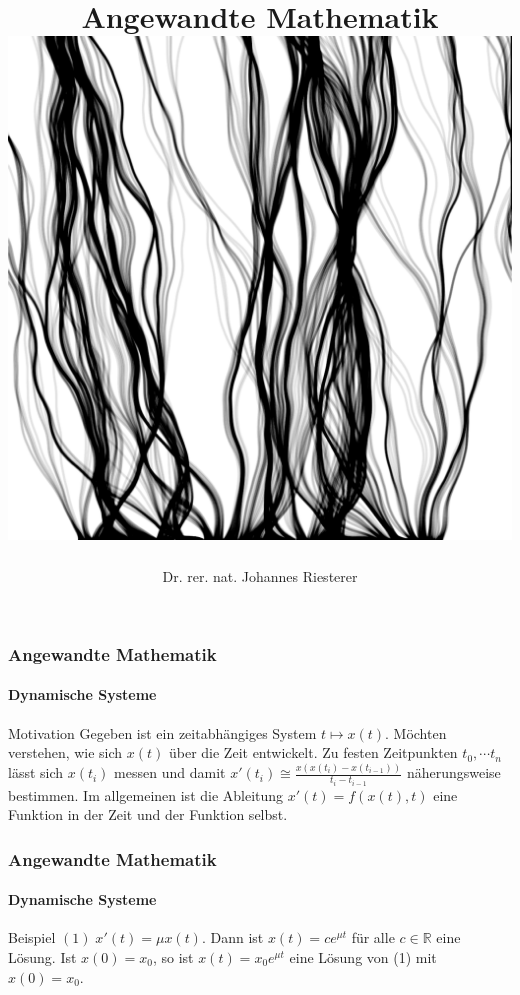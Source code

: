 \documentclass{beamer}
\begin{document}
\title[Angewandte Mathematik] %
{Angewandte Mathematik
\\
\includegraphics[scale=0.15]{images/cover}
}
\subtitle{}
\author[Dr. Johannes Riesterer] %
{Dr.  rer. nat. Johannes Riesterer}

\date[KPT 2004] %
{}

\subject{Angewandte Mathematik}




\begin{frame}
    \frametitle{Angewandte Mathematik}
\framesubtitle{Dynamische Systeme }
\begin{block}{Motivation}
Gegeben ist ein zeitabhängiges System $t \mapsto x(t)$. 
Möchten verstehen, wie sich $x(t)$ über die Zeit entwickelt. 
Zu festen Zeitpunkten $t_0, \cdots t_n $ lässt sich $x(t_i)$ messen und damit $x'(t_i) \cong \frac{x(x(t_i) - x(t_{i-1}))}{t_i - t_{i-1}}$ näherungsweise bestimmen. Im allgemeinen ist die Ableitung $x'(t) = f(x(t), t)$ eine Funktion in der Zeit und der Funktion selbst. 
\end{block}
 \end{frame}

\begin{frame}
    \frametitle{Angewandte Mathematik}
\framesubtitle{Dynamische Systeme }
\begin{block}{Beispiel}
$(1) \;x'(t) = \mu x(t)$.  
Dann ist $x(t)= c e^{\mu t}$ für alle $c \in \mathbb{R}$ eine Lösung. Ist $x(0) = x_0$, so ist   $x(t)= x_0 e^{\mu t}$ eine Lösung von (1) mit $x(0) = x_0$. 
\end{block}
 \end{frame}
\end{document}
